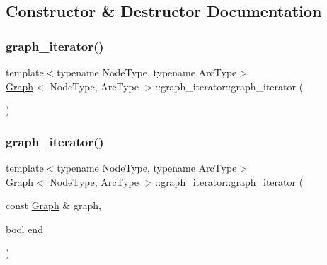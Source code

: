 \subsection{Constructor \& Destructor Documentation}
\mbox{\label{classGraph_1_1graph__iterator_a8b196d38303d26eed7e4dff770ca5afe}} 
\subsubsection{\texorpdfstring{graph\+\_\+iterator()}{graph\_iterator()}\hspace{0.1cm}{\footnotesize\ttfamily [1/3]}}
{\footnotesize\ttfamily template$<$typename Node\+Type, typename Arc\+Type$>$ \\
\mbox{\hyperlink{classGraph}{Graph}}$<$ Node\+Type, Arc\+Type $>$\+::graph\+\_\+iterator\+::graph\+\_\+iterator (\begin{DoxyParamCaption}{ }\end{DoxyParamCaption})\hspace{0.3cm}{\ttfamily [inline]}}

\mbox{\label{classGraph_1_1graph__iterator_a366ad38669a4391ec3bfa8b1272fe4df}} 
\subsubsection{\texorpdfstring{graph\+\_\+iterator()}{graph\_iterator()}\hspace{0.1cm}{\footnotesize\ttfamily [2/3]}}
{\footnotesize\ttfamily template$<$typename Node\+Type, typename Arc\+Type$>$ \\
\mbox{\hyperlink{classGraph}{Graph}}$<$ Node\+Type, Arc\+Type $>$\+::graph\+\_\+iterator\+::graph\+\_\+iterator (\begin{DoxyParamCaption}\item[{const \mbox{\hyperlink{classGraph}{Graph}} \&}]{graph,  }\item[{bool}]{end }\end{DoxyParamCaption})\hspace{0.3cm}{\ttfamily [inline]}}

